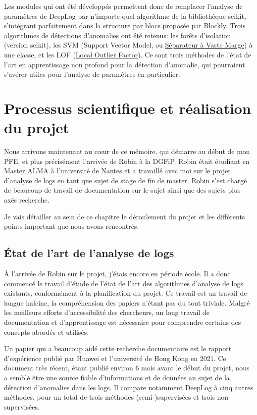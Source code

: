 \documentclass[openany, 11pt]{memoir}
\begin{document}
Les modules qui ont été développés permettent donc de remplacer l'analyse de paramètres de DeepLog par n'importe quel algorithme de la bibliothèque scikit, s'intégrant parfaitement dans la structure par blocs proposée par Blockly. Trois algorithmes de détections d'anomalies ont été retenus: les forêts d'isolation (version scikit), les SVM (Support Vector Model, ou \href{https://fr.wikipedia.org/wiki/Machine_à_vecteurs_de_support}{Séparateur à Vaste Marge}) à une classe, et les LOF (\href{https://en.wikipedia.org/wiki/Local_outlier_factor}{Local Outlier Factor}). Ce sont trois méthodes de l'état de l'art en apprentissage non profond pour la détection d'anomalie, qui pourraient s'avérer utiles pour l'analyse de paramètres en particulier.

\newpage
\chapter{Processus scientifique et réalisation du projet}

Nous arrivons maintenant au cœur de ce mémoire, qui démarre au début de mon PFE, et plus précisément l'arrivée de Robin à la \gls{DGFiP}. Robin était étudiant en Master ALMA à l'université de Nantes et a travaillé avec moi sur le projet d'analyse de \glspl{log} en tant que sujet de stage de fin de master. Robin s'est chargé de beaucoup de travail de documentation sur le sujet ainsi que des sujets plus axés recherche.

Je vais détailler au sein de ce chapitre le déroulement du projet et les différents points important que nous avons rencontrés.

\section{État de l'art de l'analyse de logs}

À l'arrivée de Robin sur le projet, j'étais encore en période école. Il a donc commencé le travail d'étude de l'état de l'art des algorithmes d'analyse de \glspl{log} existants, conformément à la planification du projet. Ce travail est un travail de longue haleine, la compréhension des papiers n'étant pas du tout triviale. Malgré les meilleurs efforts d'accessibilité des chercheurs, un long travail de documentation et d'apprentissage est nécessaire pour comprendre certains des concepts abordés et utilisés.

Un papier qui a beaucoup aidé cette recherche documentaire est le rapport d'expérience \cite{experiencereport} publié par Huawei et l'université de Hong Kong en 2021. Ce document très récent, étant publié environ 6 mois avant le début du projet, nous a semblé être une source fiable d'informations et de données au sujet de la détection d'anomalies dans les logs. Il compare notamment DeepLog à cinq autres méthodes, pour un total de trois méthodes (semi-)supervisées et trois non-supervisées.
\end{document}

